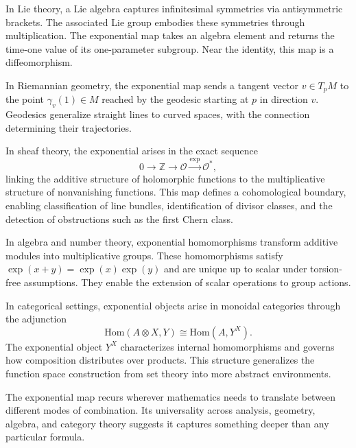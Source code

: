 In Lie theory, a Lie algebra captures infinitesimal symmetries via antisymmetric brackets. The associated Lie group embodies these symmetries through multiplication. The exponential map takes an algebra element and returns the time-one value of its one-parameter subgroup. Near the identity, this map is a diffeomorphism.

In Riemannian geometry, the exponential map sends a tangent vector \( v \in T_p M \) to the point \( \gamma_v(1) \in M \) reached by the geodesic starting at \( p \) in direction \( v \). Geodesics generalize straight lines to curved spaces, with the connection determining their trajectories.

In sheaf theory, the exponential arises in the exact sequence
\[
0 \to \mathbb{Z} \to \mathcal{O} \xrightarrow{\exp} \mathcal{O}^*,
\]
linking the additive structure of holomorphic functions to the multiplicative structure of nonvanishing functions. This map defines a cohomological boundary, enabling classification of line bundles, identification of divisor classes, and the detection of obstructions such as the first Chern class.

In algebra and number theory, exponential homomorphisms transform additive modules into multiplicative groups. These homomorphisms satisfy \( \exp(x + y) = \exp(x)\exp(y) \) and are unique up to scalar under torsion-free assumptions. They enable the extension of scalar operations to group actions.

In categorical settings, exponential objects arise in monoidal categories through the adjunction
\[
\mathrm{Hom}(A \otimes X, Y) \cong \mathrm{Hom}(A, Y^X).
\]
The exponential object \( Y^X \) characterizes internal homomorphisms and governs how composition distributes over products. This structure generalizes the function space construction from set theory into more abstract environments.

The exponential map recurs wherever mathematics needs to translate between different modes of combination. Its universality across analysis, geometry, algebra, and category theory suggests it captures something deeper than any particular formula.


